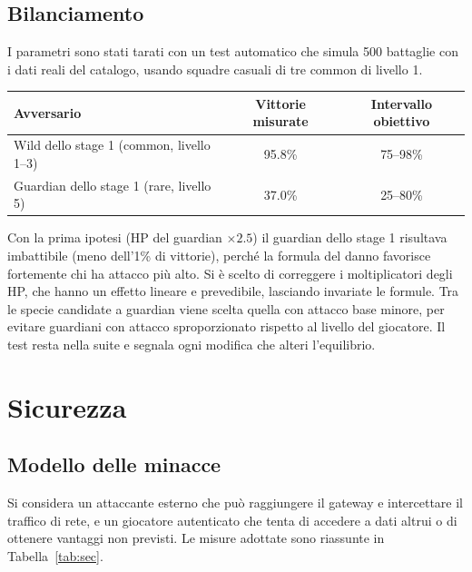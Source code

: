 \documentclass[11pt,a4paper]{report}
\begin{document}
\section{Bilanciamento}

I parametri sono stati tarati con un test automatico che simula 500 battaglie con i dati reali del catalogo, usando squadre casuali di tre common di livello 1.

\begin{center}\small
\begin{tabular}{@{}lcc@{}}
\toprule
\textbf{Avversario} & \textbf{Vittorie misurate} & \textbf{Intervallo obiettivo} \\
\midrule
Wild dello stage 1 (common, livello 1--3) & 95.8\% & 75--98\% \\
Guardian dello stage 1 (rare, livello 5) & 37.0\% & 25--80\% \\
\bottomrule
\end{tabular}
\end{center}

Con la prima ipotesi (HP del guardian $\times 2.5$) il guardian dello stage 1 risultava imbattibile (meno dell'1\% di vittorie), perché la formula del danno favorisce fortemente chi ha attacco più alto. Si è scelto di correggere i moltiplicatori degli HP, che hanno un effetto lineare e prevedibile, lasciando invariate le formule. Tra le specie candidate a guardian viene scelta quella con attacco base minore, per evitare guardiani con attacco sproporzionato rispetto al livello del giocatore. Il test resta nella suite e segnala ogni modifica che alteri l'equilibrio.

\chapter{Sicurezza}
\label{ch:security}

\section{Modello delle minacce}

Si considera un attaccante esterno che può raggiungere il gateway e intercettare il traffico di rete, e un giocatore autenticato che tenta di accedere a dati altrui o di ottenere vantaggi non previsti. Le misure adottate sono riassunte in Tabella~\ref{tab:sec}.
\end{document}
